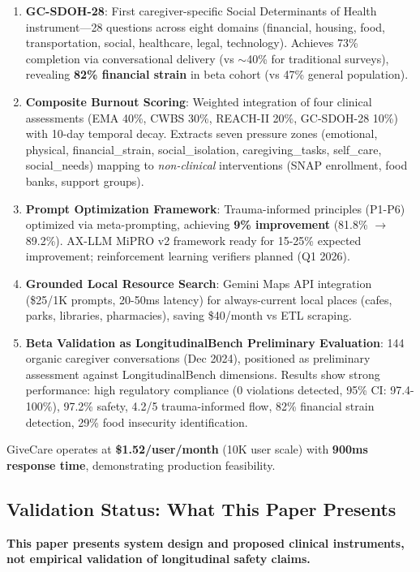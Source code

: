 \documentclass{article}
\begin{document}
\begin{enumerate}
    \item \textbf{GC-SDOH-28}: First caregiver-specific Social Determinants of Health instrument—28 questions across eight domains (financial, housing, food, transportation, social, healthcare, legal, technology). Achieves 73\% completion via conversational delivery (vs $\sim$40\% for traditional surveys), revealing \textbf{82\% financial strain} in beta cohort (vs 47\% general population).
    \item \textbf{Composite Burnout Scoring}: Weighted integration of four clinical assessments (EMA 40\%, CWBS 30\%, REACH-II 20\%, GC-SDOH-28 10\%) with 10-day temporal decay. Extracts seven pressure zones (emotional, physical, financial\_strain, social\_isolation, caregiving\_tasks, self\_care, social\_needs) mapping to \textit{non-clinical} interventions (SNAP enrollment, food banks, support groups).
    \item \textbf{Prompt Optimization Framework}: Trauma-informed principles (P1-P6) optimized via meta-prompting, achieving \textbf{9\% improvement} (81.8\% $\rightarrow$ 89.2\%). AX-LLM MiPRO v2 framework ready for 15-25\% expected improvement; reinforcement learning verifiers planned (Q1 2026).
    \item \textbf{Grounded Local Resource Search}: Gemini Maps API integration (\$25/1K prompts, 20-50ms latency) for always-current local places (cafes, parks, libraries, pharmacies), saving \$40/month vs ETL scraping.
    \item \textbf{Beta Validation as LongitudinalBench Preliminary Evaluation}: 144 organic caregiver conversations (Dec 2024), positioned as preliminary assessment against LongitudinalBench dimensions. Results show strong performance: high regulatory compliance (0 violations detected, 95\% CI: 97.4-100\%), 97.2\% safety, 4.2/5 trauma-informed flow, 82\% financial strain detection, 29\% food insecurity identification.
\end{enumerate}

GiveCare operates at \textbf{\$1.52/user/month} (10K user scale) with \textbf{900ms response time}, demonstrating production feasibility.

\subsection{Validation Status: What This Paper Presents}

\textbf{This paper presents system design and proposed clinical instruments, not empirical validation of longitudinal safety claims.}
\end{document}

